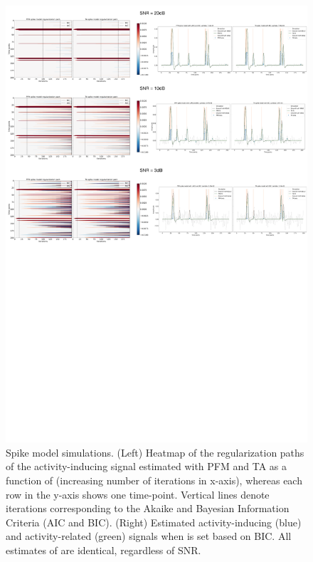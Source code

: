 \begin{figure}[t!]
    \begin{center}
        \includegraphics[width=\textwidth]{figures/regpath_spike.pdf}
    \end{center}
    \caption{Spike model simulations. (Left) Heatmap of the regularization paths of the activity-inducing signal estimated with PFM and TA as a function of (increasing number of iterations in x-axis), whereas each row in the y-axis shows one time-point. Vertical lines denote iterations corresponding to the Akaike and Bayesian Information Criteria (AIC and BIC). (Right) Estimated activity-inducing (blue) and activity-related (green) signals when is set based on BIC. All estimates of are identical, regardless of SNR.}
\label{fig:path_spike}
\end{figure}

